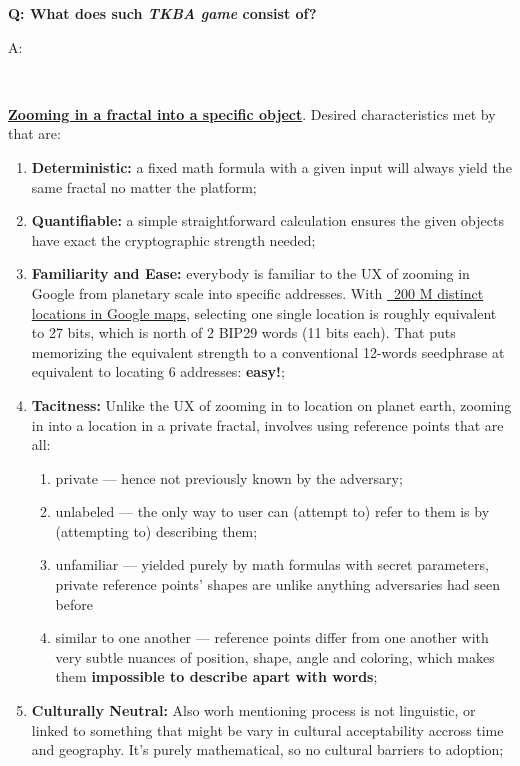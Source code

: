 \documentclass[12pt,a4paper]{article}
\newenvironment{question}[1]{%
  \vspace{0.8em}\noindent\textbf{Q: #1}\par
  \vspace{0.2em}\noindent\begin{itshape}A:\end{itshape}~%
}{\vspace{0.8em}}
\newcommand{\gmaps}{https://blog.google/products/maps/15-years-of-mapping-the-world-makes-search-better/}
\begin{document}
\begin{question}{What does such \textit{TKBA game} consist of?}
\href{https://www.youtube.com/watch?v=bI8fiGmpHR0}{\textbf{Zooming in a fractal into a specific object}}. Desired characteristics met by that are:
\begin{enumerate}
 \item \textbf{Deterministic:} a fixed math formula with a given input will always yield the same fractal no matter the platform;
 \item \textbf{Quantifiable:} a simple straightforward calculation ensures the given objects have exact the cryptographic strength needed;
 \item \textbf{Familiarity and Ease:} everybody is familiar to the UX of zooming in Google from planetary scale into specific addresses. With \href{\gmaps}{~200 M distinct locations in Google maps}, selecting one single location is roughly equivalent to 27 bits, which is north of 2 BIP29 words (11 bits each). That puts memorizing the equivalent strength to a conventional 12-words seedphrase at equivalent to locating 6 addresses: \textbf{easy!};
 \item \textbf{Tacitness:} Unlike the UX of zooming in to location on planet earth, zooming in into a location in a private fractal, involves using reference points that are all:
 \begin{enumerate}
  \item private --- hence not previously known by the adversary;
  \item unlabeled --- the only way to user can (attempt to) refer to them is by (attempting to) describing them;
  \item unfamiliar --- yielded purely by math formulas with secret parameters, private reference points' shapes are unlike anything adversaries had seen before
  \item similar to one another --- reference points differ from one another with very subtle nuances of position, shape, angle and coloring, which makes them \textbf{impossible to describe apart with words};
 \end{enumerate}
 \item \textbf{Culturally Neutral:} Also worh mentioning process is not linguistic, or linked to something that might be vary in cultural acceptability accross time and geography. It's purely mathematical, so no cultural barriers to adoption;
\end{enumerate}


\end{question}
\end{document}
